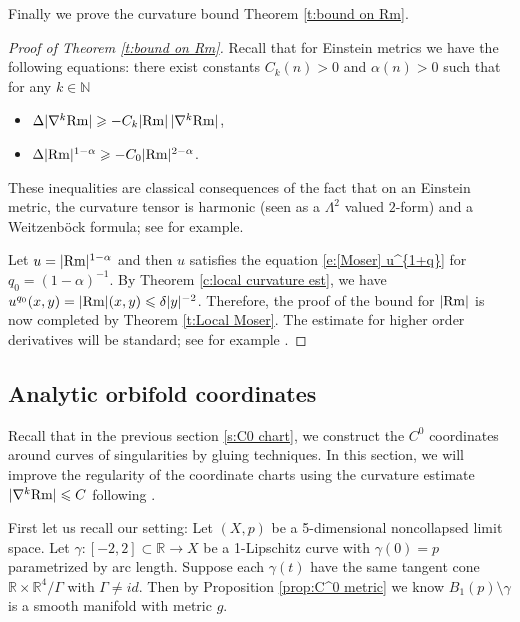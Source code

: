 \documentclass[11pt,reqno]{amsart}
\numberwithin{equation}{section}
\newcommand{\RR}{\mathds{R}}
\newcommand{\Rm}{{\rm Rm}}
\theoremstyle{definition}
\theoremstyle{remark}
\begin{document}
Finally we prove the curvature bound Theorem \ref{t:bound on Rm}.

\begin{proof}[Proof of Theorem \ref{t:bound on Rm}]
Recall that for Einstein metrics we have the following equations: there exist constants $C_k(n)>0$ and $\alpha(n)>0$ such that for any $k\in\mathbb{N}$
\begin{itemize}
    \item $\Delta |\nabla^k\Rm| \geqslant - C_k|\Rm|\,|\nabla^k\Rm|$,
    \item $\Delta |\Rm|^{1-\alpha} \geqslant - C_0|\Rm|^{2-\alpha}$.
\end{itemize}
These inequalities are classical consequences of the fact that on an Einstein metric, the curvature tensor is harmonic (seen as a $\Lambda^2$ valued $2$-form) and a Weitzenböck formula; see \cite{bkn} for example.


Let $u = |\Rm|^{1-\alpha}$ and then $u$ satisfies the equation \eqref{e:[Moser] u^{1+q}} for $q_0 = (1 -\alpha)^{-1}$. By Theorem \ref{c:local curvature est}, we have $u^{q_0}(x,y) = |\Rm|(x,y) \leqslant \delta |y|^{-2}$. Therefore, the proof of the bound for $|\Rm|$ is now completed by Theorem \ref{t:Local Moser}. The estimate for higher order derivatives will be standard; see for example \cite{DS}.
\end{proof}









\subsection{Analytic orbifold coordinates}


Recall that in the previous section \ref{s:C0 chart}, we construct the $C^0$ coordinates around curves of singularities by gluing techniques. In this section, we will improve the regularity of the coordinate charts using the curvature estimate $|\nabla^k \Rm| \leqslant C$ following \cite{DS}.

First let us recall our setting: Let $(X,p)$ be a 5-dimensional noncollapsed limit space. Let $\gamma:[-2, 2 ] \subset \RR \to X$ be a 1-Lipschitz curve with $\gamma(0) = p$ parametrized by arc length. Suppose each $\gamma(t)$ have the same tangent cone $\RR \times \RR^4/\Gamma$ with $\Gamma \neq id$. Then by Proposition \ref{prop:C^0 metric} we know $B_1(p) \setminus \gamma$ is a smooth manifold with metric $g$. 
\end{document}

